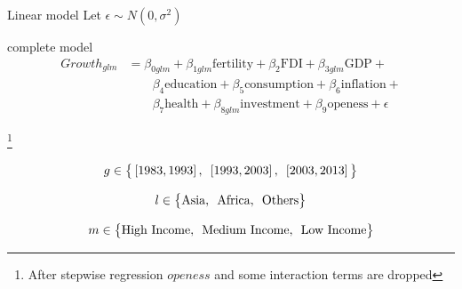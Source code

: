 \documentclass[9pt]{beamer}
\begin{document}
\begin{frame}{Linear model}
	Let $ \epsilon \sim N(0,\sigma^2)$
	\begin{block}{complete model}
	  \begin{align*}
	  Growth_{glm} &= \beta_{0glm}+\beta_{1glm}\text{fertility}+\beta_{2}\text{FDI}+\beta_{3glm}\text{GDP}+\\
	  &\qquad
	   \beta_{4}\text{education}+\beta_{5}\text{consumption}+\beta_{6}\text{inflation}+\\
	  &\qquad \beta_{7}\text{health}+\beta_{8glm}\text{investment}+\beta_{9}\text{openess} + \epsilon
	  \end{align*}
	\end{block}
	\footnote{After stepwise regression $openess$ and some interaction terms are dropped}
	
	
	
	\begin{block}{}
		\[
		g \in \big\{ \left[1983,1993 \right],\enskip \left[1993,2003 \right],\enskip \left[2003,2013 \right]   \big\}
		\]
		
		\[
		l \in \big\{ \text{Asia},\enskip \text{Africa} ,\enskip \text{Others}    \big\}
		\]
		
		\[
		m \in \big\{ \text{High Income}, \enskip \text{Medium Income}, \enskip \text{Low Income}\big\}
		\]
	\end{block}
	
\end{frame}
\end{document}

